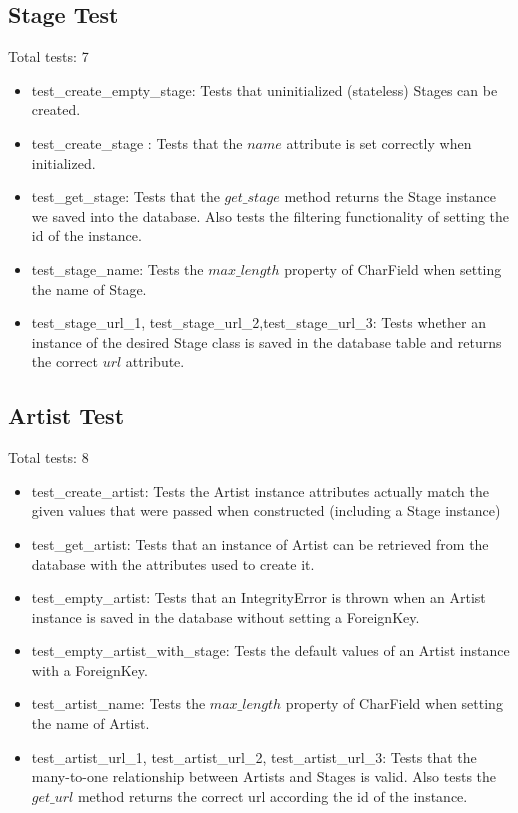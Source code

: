 \documentclass[12pt,english]{scrartcl}
\begin{document}
\subsection{Stage Test}
Total tests: 7
\begin{itemize}
\item test\_create\_empty\_stage: Tests that uninitialized (stateless) Stages can be created.

\item test\_create\_stage : Tests that the $name$ attribute is set correctly when initialized.
 
\item test\_get\_stage: Tests that the $get\_stage$ method returns the Stage instance we saved into the database. Also tests the filtering functionality of setting the id of the instance.

\item test\_stage\_name: Tests the $max\_length$ property of CharField when setting the name of Stage.

\item test\_stage\_url\_1, test\_stage\_url\_2,test\_stage\_url\_3: Tests whether an instance of the desired Stage class 
is saved in the database table and returns the correct $url$ attribute. 
\end{itemize} 

\subsection{Artist Test}
Total tests: 8
\begin{itemize}
\item test\_create\_artist: Tests the Artist instance attributes actually match the given values
that were passed when constructed (including a Stage instance)
 
\item test\_get\_artist: Tests that an instance of Artist can be retrieved from the database with the attributes used to create it.
 
\item test\_empty\_artist: Tests that an IntegrityError is thrown when an Artist instance is saved in the database without setting a ForeignKey.
 
\item test\_empty\_artist\_with\_stage: Tests the default values of an Artist instance with a ForeignKey.
 
\item test\_artist\_name: Tests the $max\_length$ property of CharField when setting the name of Artist.
 
\item test\_artist\_url\_1, test\_artist\_url\_2, test\_artist\_url\_3: Tests that the many-to-one relationship between
Artists and Stages is valid. Also tests the $get\_url$ method returns the correct url according the id of the instance.
\end{itemize} 
\end{document}
